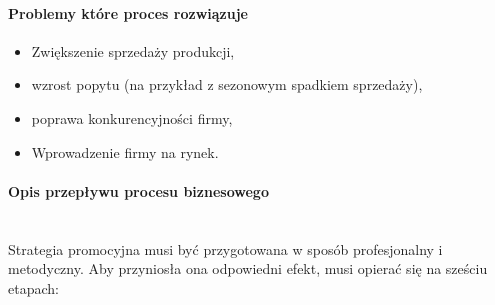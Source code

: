 \documentclass[a4paper, 12pt]{article}
\begin{document}
\paragraph{Problemy które proces rozwiązuje}
\begin{itemize}
	\item Zwiększenie sprzedaży produkcji,
	\item wzrost popytu (na przykład z sezonowym spadkiem sprzedaży),
	\item poprawa konkurencyjności firmy,
	\item Wprowadzenie firmy na rynek.
\end{itemize}
\newpage
\paragraph{Opis przepływu procesu biznesowego}\mbox{}\\
\hspace*{1 cm}Strategia promocyjna musi być przygotowana w sposób profesjonalny i metodyczny. Aby przyniosła ona odpowiedni efekt, musi opierać się na sześciu etapach:
\end{document}
